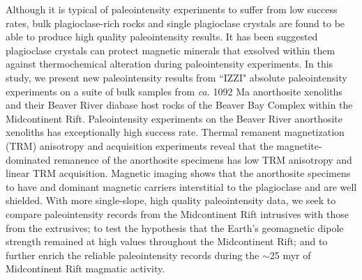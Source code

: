 \documentclass[draft]{agujournal2019}
\begin{document}
Although it is typical of paleointensity experiments to suffer from low success rates, bulk plagioclase-rich rocks \cite{Selkin2000a} and single plagioclase crystals \cite{Tarduno2005a} are found to be able to produce high quality paleointensity results. It has been suggested plagioclase crystals can protect magnetic minerals that exsolved within them against thermochemical alteration during paleointensity experiments. In this study, we present new paleointensity results from ``IZZI" absolute paleointensity experiments \cite{Yu2004a} on a suite of bulk samples from \textit{ca.} 1092 Ma anorthosite xenoliths and their Beaver River diabase host rocks of the Beaver Bay Complex within the Midcontinent Rift. Paleointensity experiments on the Beaver River anorthosite xenoliths has exceptionally high success rate. Thermal remanent magnetization (TRM) anisotropy and acquisition experiments reveal that the magnetite-dominated remanence of the anorthosite specimens has low TRM anisotropy and linear TRM acquisition. Magnetic imaging shows that the anorthosite specimens to have and dominant magnetic carriers interstitial to the plagioclase and are well shielded. With more single-slope, high quality paleointensity data, we seek to compare paleointensity records from the Midcontinent Rift intrusives with those from the extrusives; to test the hypothesis that the Earth's geomagnetic dipole strength remained at high values throughout the Midcontinent Rift; and to further enrich the reliable paleointensity records during the $\sim$25 myr of Midcontinent Rift magmatic activity. 


\end{document}
